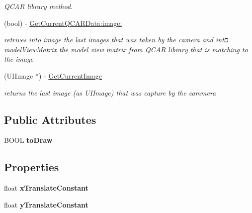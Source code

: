 \begin{DoxyCompactItemize}
\begin{DoxyCompactList}\small\item\em \-Q\-C\-A\-R library method. \end{DoxyCompactList}\item 
\hypertarget{interface_e_a_g_l_view_q_c_a_r_a16fa0c52ca6948515231445c2124fe66}{
(bool) -\/ \hyperlink{interface_e_a_g_l_view_q_c_a_r_a16fa0c52ca6948515231445c2124fe66}{\-Get\-Current\-Q\-C\-A\-R\-Data\-:image\-:}}
\label{interface_e_a_g_l_view_q_c_a_r_a16fa0c52ca6948515231445c2124fe66}

\begin{DoxyCompactList}\small\item\em retrives into image the last images that was taken by the camera and intם model\-View\-Matrix the model view matrix from \-Q\-C\-A\-R library that is matching to the image \end{DoxyCompactList}\item 
\hypertarget{interface_e_a_g_l_view_q_c_a_r_a1742e0aa943e2a5705d73977e3445a19}{
(\-U\-I\-Image $\ast$) -\/ \hyperlink{interface_e_a_g_l_view_q_c_a_r_a1742e0aa943e2a5705d73977e3445a19}{\-Get\-Current\-Image}}
\label{interface_e_a_g_l_view_q_c_a_r_a1742e0aa943e2a5705d73977e3445a19}

\begin{DoxyCompactList}\small\item\em returns the last image (as \-U\-I\-Image) that was capture by the cammera \end{DoxyCompactList}\end{DoxyCompactItemize}
\subsection*{\-Public \-Attributes}
\begin{DoxyCompactItemize}
\item 
\hypertarget{interface_e_a_g_l_view_q_c_a_r_ad124a71a66dbb89bf89d744ed53aa111}{
\-B\-O\-O\-L {\bfseries to\-Draw}}
\label{interface_e_a_g_l_view_q_c_a_r_ad124a71a66dbb89bf89d744ed53aa111}

\end{DoxyCompactItemize}
\subsection*{\-Properties}
\begin{DoxyCompactItemize}
\item 
\hypertarget{interface_e_a_g_l_view_q_c_a_r_a20c612cbf7f0952d355898699ced694f}{
float {\bfseries x\-Translate\-Constant}}
\label{interface_e_a_g_l_view_q_c_a_r_a20c612cbf7f0952d355898699ced694f}

\item 
\hypertarget{interface_e_a_g_l_view_q_c_a_r_af092da4330835533aafe4f4afaa6820f}{
float {\bfseries y\-Translate\-Constant}}
\label{interface_e_a_g_l_view_q_c_a_r_af092da4330835533aafe4f4afaa6820f}

\end{DoxyCompactItemize}



